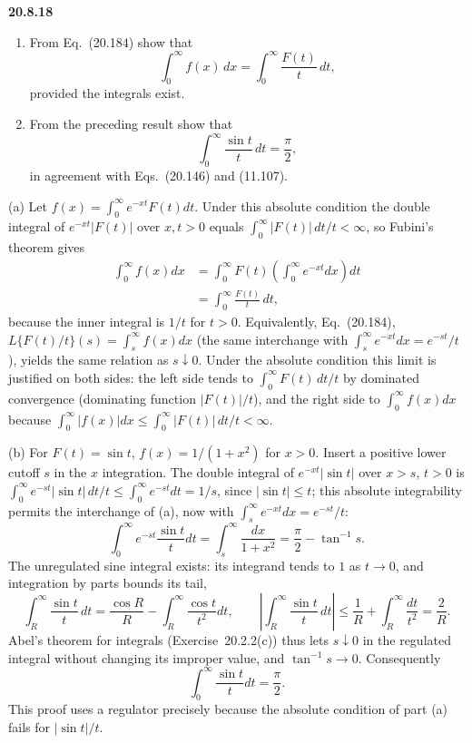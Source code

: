 \par\bigskip
\noindent\textbf{20.8.18}
\begin{enumerate}
\item[(a)] From Eq.~(20.184) show that
\[
\int_{0}^{\infty}f(x)\,dx=\int_{0}^{\infty}\frac{F(t)}{t}\,dt,
\]
provided the integrals exist.
\item[(b)] From the preceding result show that
\[
\int_{0}^{\infty}\frac{\sin t}{t}\,dt=\frac{\pi}{2},
\]
in agreement with Eqs.~(20.146) and (11.107).
\end{enumerate}
\par{}
\solution
(a) Let $f(x)=\int_0^\infty e^{-xt}F(t)dt$.
Under this absolute condition the double integral of
$e^{-xt}|F(t)|$ over $x,t>0$ equals
$\int_0^\infty|F(t)|\,dt/t<\infty$, so Fubini's theorem gives
\begin{align*}
\int_0^\infty f(x)dx
&=\int_0^\infty F(t)\left(\int_0^\infty e^{-xt}dx\right)dt\\
&=\boxed{\int_0^\infty\frac{F(t)}t\,dt},
\end{align*}
because the inner integral is $1/t$ for $t>0$.
Equivalently, Eq.~(20.184),
$L\{F(t)/t\}(s)=\int_s^\infty f(x)dx$ (the same interchange
with $\int_s^\infty e^{-xt}dx=e^{-st}/t$), yields the same
relation as $s\downarrow0$. Under the absolute condition this
limit is justified on both sides: the left side tends to
$\int_0^\infty F(t)\,dt/t$ by dominated convergence (dominating
function $|F(t)|/t$), and the right side to
$\int_0^\infty f(x)dx$ because
$\int_0^\infty|f(x)|dx\le\int_0^\infty|F(t)|\,dt/t<\infty$.

(b) For $F(t)=\sin t$, $f(x)=1/(1+x^2)$ for $x>0$. Insert a
positive lower cutoff $s$ in the $x$ integration. The double
integral of $e^{-xt}|\sin t|$ over $x>s$, $t>0$ is
$\int_0^\infty e^{-st}|\sin t|\,dt/t\le\int_0^\infty e^{-st}dt
=1/s$, since $|\sin t|\le t$; this absolute integrability
permits the interchange of (a), now with
$\int_s^\infty e^{-xt}dx=e^{-st}/t$:
\[
\int_0^\infty e^{-st}\frac{\sin t}{t}dt
=\int_s^\infty\frac{dx}{1+x^2}
=\frac\pi2-\tan^{-1}s.
\]
The unregulated sine integral exists: its integrand tends to
$1$ as $t\to0$, and integration by parts bounds its tail,
\[
\int_R^\infty\frac{\sin t}t\,dt
=\frac{\cos R}R-\int_R^\infty\frac{\cos t}{t^2}dt,
\qquad
\left|\int_R^\infty\frac{\sin t}t\,dt\right|
\le\frac1R+\int_R^\infty\frac{dt}{t^2}=\frac2R.
\]
Abel's theorem for integrals (Exercise~20.2.2(c)) thus lets
$s\downarrow0$ in the regulated integral without changing its
improper value, and $\tan^{-1}s\to0$.
Consequently
\[
\boxed{\int_0^\infty\frac{\sin t}{t}dt=\frac\pi2}.
\]
This proof uses a regulator precisely because the absolute
condition of part (a) fails for $|\sin t|/t$.

